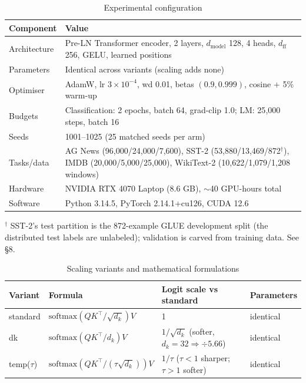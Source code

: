 \documentclass[11pt,a4paper]{article}
\begin{document}
\begin{table}[ht]
\centering\small
\caption{Experimental configuration}
\label{tab:config}
\begin{tabular}{@{}lp{11.2cm}@{}}
\toprule
\textbf{Component} & \textbf{Value} \\
\midrule
Architecture & Pre-LN Transformer encoder, 2 layers, $d_{\text{model}}$ 128, 4 heads, $d_{\text{ff}}$ 256, GELU, learned positions \\
Parameters & Identical across variants (scaling adds none) \\
Optimiser & AdamW, lr $3\times10^{-4}$, wd 0.01, betas $(0.9,0.999)$, cosine + 5\% warm-up \\
Budgets & Classification: 2 epochs, batch 64, grad-clip 1.0; LM: 25{,}000 steps, batch 16 \\
Seeds & 1001--1025 (25 matched seeds per arm) \\
Tasks/data & AG News (96{,}000/24{,}000/7{,}600), SST-2 (53{,}880/13{,}469/872$^{\dagger}$), IMDB (20{,}000/5{,}000/25{,}000), WikiText-2 (10{,}622/1{,}079/1{,}208 windows) \\
Hardware & NVIDIA RTX 4070 Laptop (8.6 GB), $\sim$40 GPU-hours total \\
Software & Python 3.14.5, PyTorch 2.14.1+cu126, CUDA 12.6 \\
\bottomrule
\end{tabular}

\vspace{2pt}
{\footnotesize $^{\dagger}$ SST-2's test partition is the 872-example GLUE development split (the distributed test labels are unlabeled); validation is carved from training data. See \S8.}
\end{table}

\begin{table}[ht]
\centering\small
\caption{Scaling variants and mathematical formulations}
\label{tab:variants}
\begin{tabular}{@{}llll@{}}
\toprule
\textbf{Variant} & \textbf{Formula} & \textbf{Logit scale vs standard} & \textbf{Parameters} \\
\midrule
standard & $\mathrm{softmax}(QK^{\top}/\sqrt{d_k})V$ & 1 & identical \\
dk & $\mathrm{softmax}(QK^{\top}/d_k)V$ & $1/\sqrt{d_k}$ (softer, $d_k{=}32 \Rightarrow \div 5.66$) & identical \\
temp($\tau$) & $\mathrm{softmax}(QK^{\top}/(\tau\sqrt{d_k}))V$ & $1/\tau$ ($\tau{<}1$ sharper; $\tau{>}1$ softer) & identical \\
\bottomrule
\end{tabular}
\end{table}
\end{document}
